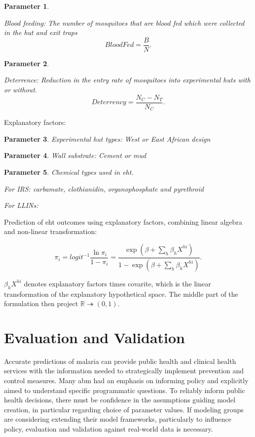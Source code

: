 \documentclass[a4paper, 12pt, twoside]{article}
\newtheorem{parameter}{Parameter}
\begin{document}
\begin{parameter}
	\label{eht:blood_fed}

	Blood feeding: The number of mosquitoes that are blood fed which were collected in the hut and exit traps
	\[
		BloodFed = \frac{B}{N}
		.\]
\end{parameter}

\begin{parameter}
	\label{eht:Deterrence}

	Deterrence: Reduction in the entry rate of mosquitoes into experimental huts with or without.
	\[
		Deterrency = \frac{N_C - N_T}{N_C}
		.\]
\end{parameter}

Explanatory factors:

\begin{parameter}
	\label{eht:experimental_hut_types}
	Experimental hut types: West or East African design

\end{parameter}

\begin{parameter}
	\label{eht:wall_substrate} Wall substrate: Cement or mud

\end{parameter}

\begin{parameter}
	\label{eht:chemical_class_used}
	Chemical types used in \gls{eht}.

	For IRS: carbamate, clothianidin, organophosphate and pyrethroid

	For LLINs:

\end{parameter}

Prediction of \gls{eht} outcomes using explanatory factors, combining linear algebra and non-linear transformation\cite{Sherrard-Smith2018b}:

\[
	\pi_i = logit^{-1} \frac{\ln \pi_i}{1-\pi_i} = \frac{ \exp( \beta + \sum_h \beta_h X^{hi} ) }{ 1 - \exp( \beta + \sum_h \beta_h X^{hi} ) }
	.\]

$\beta_h X^{hi}$ denotes explanatory factors times covarite, which is the linear transformation of the explanatory hypothetical space. The middle part of the formulation then project $\mathbb{R} \twoheadrightarrow (0,1)$.

\section{Evaluation and Validation}
Accurate predictions of malaria can provide public health and clinical health services with the information needed to strategically implement prevention and control measures.
Many \gls{abm} had an emphasis on informing policy and explicitly aimed to understand specific programmatic questions.
To reliably inform public health decisions, there must be confidence in the assumptions guiding model creation, in particular regarding choice of parameter values.
If modeling groups are considering extending their model frameworks, particularly to influence policy, evaluation and validation against real-world data is necessary.
\end{document}
